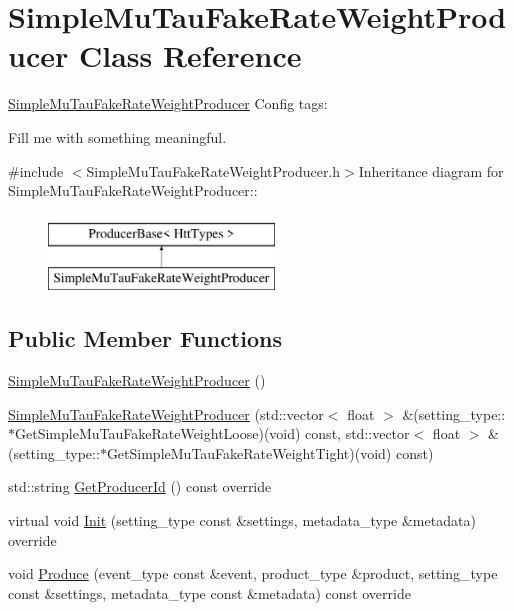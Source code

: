\hypertarget{classSimpleMuTauFakeRateWeightProducer}{
\section{SimpleMuTauFakeRateWeightProducer Class Reference}
\label{classSimpleMuTauFakeRateWeightProducer}
}


\hyperlink{classSimpleMuTauFakeRateWeightProducer}{SimpleMuTauFakeRateWeightProducer} Config tags:
\begin{DoxyItemize}
\item Fill me with something meaningful. 
\end{DoxyItemize} 


{\ttfamily \#include $<$SimpleMuTauFakeRateWeightProducer.h$>$}Inheritance diagram for SimpleMuTauFakeRateWeightProducer::\begin{figure}[H]
\begin{center}
\leavevmode
\includegraphics[height=2cm]{classSimpleMuTauFakeRateWeightProducer}
\end{center}
\end{figure}
\subsection*{Public Member Functions}
\begin{DoxyCompactItemize}
\item 
\hyperlink{classSimpleMuTauFakeRateWeightProducer_ae3ec7f5119239f3b455485c93c66c094}{SimpleMuTauFakeRateWeightProducer} ()
\item 
\hyperlink{classSimpleMuTauFakeRateWeightProducer_ab156e0e55bda16af0018394f2b3cd774}{SimpleMuTauFakeRateWeightProducer} (std::vector$<$ float $>$ \&(setting\_\-type::$\ast$GetSimpleMuTauFakeRateWeightLoose)(void) const, std::vector$<$ float $>$ \&(setting\_\-type::$\ast$GetSimpleMuTauFakeRateWeightTight)(void) const)
\item 
std::string \hyperlink{classSimpleMuTauFakeRateWeightProducer_a2714e7efceb501143c18768665ce0a92}{GetProducerId} () const override
\item 
virtual void \hyperlink{classSimpleMuTauFakeRateWeightProducer_a394c600233ec859eac5f5147686ee579}{Init} (setting\_\-type const \&settings, metadata\_\-type \&metadata) override
\item 
void \hyperlink{classSimpleMuTauFakeRateWeightProducer_ae34820676c70aefa5563f811ba22611d}{Produce} (event\_\-type const \&event, product\_\-type \&product, setting\_\-type const \&settings, metadata\_\-type const \&metadata) const override
\end{DoxyCompactItemize}


